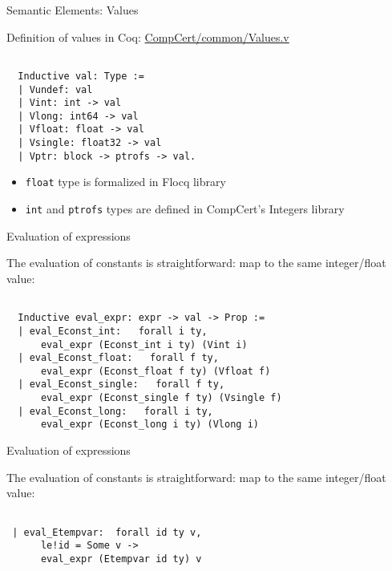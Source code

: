 \documentclass{beamer}
\begin{document}
\begin{frame}[t,fragile]{Semantic Elements: Values}

 Definition of values in Coq: \url{CompCert/common/Values.v}
  
 \begin{lstlisting}[language=Coq]
   
  Inductive val: Type :=
  | Vundef: val
  | Vint: int -> val
  | Vlong: int64 -> val
  | Vfloat: float -> val
  | Vsingle: float32 -> val
  | Vptr: block -> ptrofs -> val.
\end{lstlisting}



\begin{itemize}
\item \texttt{float} type is formalized in Flocq library
\item \texttt{int} and \texttt{ptrofs} types are defined in CompCert's Integers library
\end{itemize}
  
\end{frame}  











  

\begin{frame}[fragile]{Evaluation of expressions}
 
The evaluation of constants is straightforward: map to the same integer/float value:
  
    \begin{lstlisting}[language=Coq]
   
  Inductive eval_expr: expr -> val -> Prop :=
  | eval_Econst_int:   forall i ty,
      eval_expr (Econst_int i ty) (Vint i)
  | eval_Econst_float:   forall f ty,
      eval_expr (Econst_float f ty) (Vfloat f)
  | eval_Econst_single:   forall f ty,
      eval_expr (Econst_single f ty) (Vsingle f)
  | eval_Econst_long:   forall i ty,
      eval_expr (Econst_long i ty) (Vlong i)
\end{lstlisting}
\end{frame}


\begin{frame}[fragile]{Evaluation of expressions}
 
The evaluation of constants is straightforward: map to the same integer/float value:
  
    \begin{lstlisting}[language=Coq]
   
 | eval_Etempvar:  forall id ty v,
      le!id = Some v ->
      eval_expr (Etempvar id ty) v
\end{lstlisting}
\end{frame}
\end{document}
